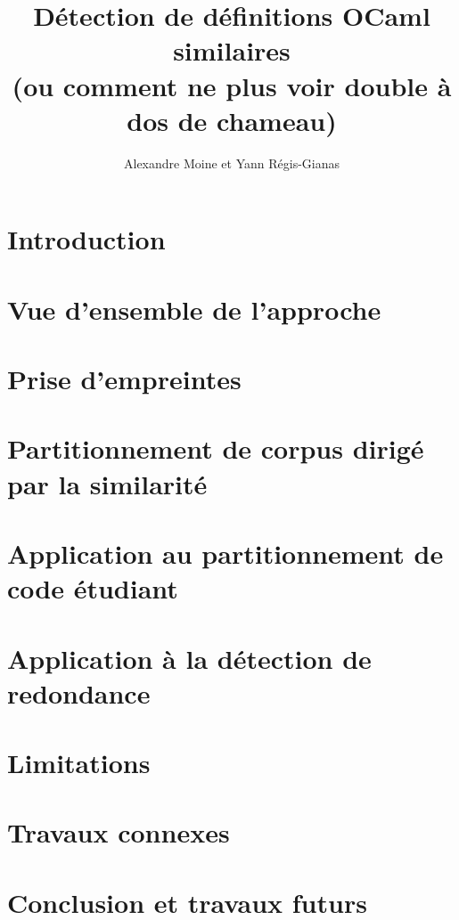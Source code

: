 \documentclass[a4paper]{easychair}
\title{Détection de définitions OCaml similaires \\
(ou comment ne plus voir double à dos de chameau)}
\author{Alexandre Moine et Yann Régis-Gianas}
\institute{Université de Paris}
\begin{document}
\maketitle

\begin{abstract}

\end{abstract}

\section{Introduction}


\section{Vue d'ensemble de l'approche}
\label{sec:overview}


\section{Prise d'empreintes}
\label{sec:hash}


\section{Partitionnement de corpus dirigé par la similarité}
\label{sec:clustering}


\section{Application au partitionnement de code étudiant}
\label{sec:partition}


\section{Application à la détection de redondance}
\label{sec:redundancy}


\section{Limitations}
\label{sec:limitations}


\section{Travaux connexes}
\label{sec:related-work}


\section{Conclusion et travaux futurs}
\label{sec:conclusion}





\end{document}

